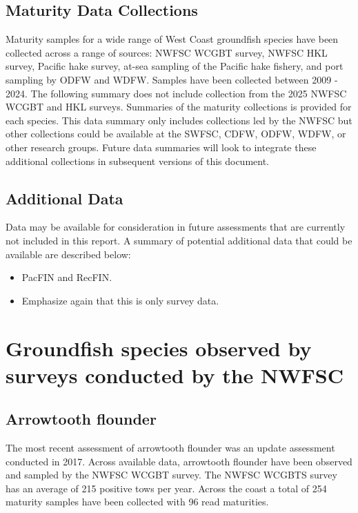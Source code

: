 \documentclass[
  english,
]{article}
\begin{document}
\subsection{Maturity Data Collections}\label{maturity-data-collections}

Maturity samples for a wide range of West Coast groundfish species have
been collected across a range of sources: NWFSC WCGBT survey, NWFSC HKL
survey, Pacific hake survey, at-sea sampling of the Pacific hake
fishery, and port sampling by ODFW and WDFW. Samples have been collected
between 2009 - 2024. The following summary does not include collection
from the 2025 NWFSC WCGBT and HKL surveys. Summaries of the maturity
collections is provided for each species. This data summary only
includes collections led by the NWFSC but other collections could be
available at the SWFSC, CDFW, ODFW, WDFW, or other research groups.
Future data summaries will look to integrate these additional
collections in subsequent versions of this document.

\subsection{Additional Data}\label{additional-data}

Data may be available for consideration in future assessments that are
currently not included in this report. A summary of potential additional
data that could be available are described below:

\begin{itemize}
\item
  PacFIN and RecFIN.
\item
  Emphasize again that this is only survey data.
\end{itemize}

\newpage{}

\section{Groundfish species observed by surveys conducted by the
NWFSC}\label{groundfish-species-observed-by-surveys-conducted-by-the-nwfsc}

\subsection{Arrowtooth flounder}\label{arrowtooth-flounder}

The most recent assessment of arrowtooth flounder was an update
assessment conducted in 2017. Across available data, arrowtooth flounder
have been observed and sampled by the NWFSC WCGBT survey. The NWFSC
WCGBTS survey has an average of 215 positive tows per year. Across the
coast a total of 254 maturity samples have been collected with 96 read
maturities.
\end{document}
